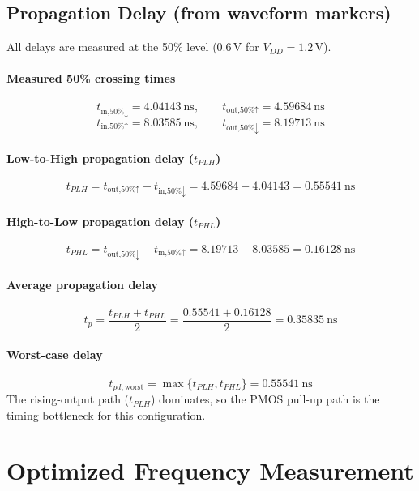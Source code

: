 \documentclass[12pt]{article}
\begin{document}
\subsection*{Propagation Delay (from waveform markers)}

All delays are measured at the 50\% level (\(0.6\,\text{V}\) for \(V_{DD}=1.2\,\text{V}\)).

\paragraph{Measured 50\% crossing times}
\[
t_{\text{in,50\%}\downarrow}=4.04143~\text{ns}, \qquad
t_{\text{out,50\%}\uparrow}=4.59684~\text{ns}
\]
\[
t_{\text{in,50\%}\uparrow}=8.03585~\text{ns}, \qquad
t_{\text{out,50\%}\downarrow}=8.19713~\text{ns}
\]

\paragraph{Low-to-High propagation delay (\(t_{PLH}\))}
\[
t_{PLH}=t_{\text{out,50\%}\uparrow}-t_{\text{in,50\%}\downarrow}
      =4.59684-4.04143
      =\boxed{0.55541~\text{ns}}
\]

\paragraph{High-to-Low propagation delay (\(t_{PHL}\))}
\[
t_{PHL}=t_{\text{out,50\%}\downarrow}-t_{\text{in,50\%}\uparrow}
      =8.19713-8.03585
      =\boxed{0.16128~\text{ns}}
\]

\paragraph{Average propagation delay}
\[
t_p=\frac{t_{PLH}+t_{PHL}}{2}
   =\frac{0.55541+0.16128}{2}
   =\boxed{0.35835~\text{ns}}
\]

\paragraph{Worst-case delay}
\[
t_{pd,\text{worst}}=\max\{t_{PLH},t_{PHL}\}=\boxed{0.55541~\text{ns}}
\]
The rising-output path (\(t_{PLH}\)) dominates, so the PMOS pull-up path is the timing bottleneck for this configuration.


\newpage

\section{Optimized Frequency Measurement}
\end{document}
